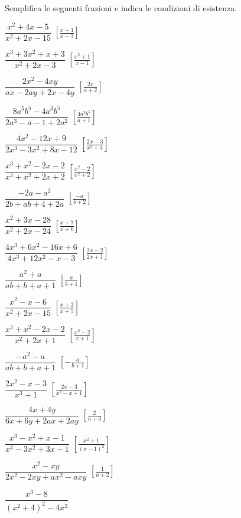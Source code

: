 \begin{esercizio}[\Ast]
\label{ese:19.10}
Semplifica le seguenti frazioni e indica le condizioni di esistenza.
\begin{multicols}{2}
\begin{enumeratea}
 \item \(\dfrac{x^{2}+4x-5}{x^{2}+2x-15}\)
  \hfill \(\left[\frac{x-1}{x-3}\right]\)
 \item \(\dfrac{x^{3}+3x^{2}+x+3}{x^{2}+2x-3}\)
  \hfill \(\left[\frac{x^2+1}{x-1}\right]\)
 \item \(\dfrac{2x^{2}-4xy}{ax-2ay+2x-4y}\)
  \hfill \(\left[\frac{2x}{a+2}\right]\)
 \item \(\dfrac{8a^{5}b^{5}-4a^{3}b^{5}}{2a^{3}-a-1+2a^{2}}\)
  \hfill \(\left[\frac{4a^{3}b^{5}}{a+1}\right]\)
 \item \(\dfrac{4x^{2}-12x+9}{2x^{3}-3x^{2}+8x-12}\)
  \hfill \(\left[\frac{2x-3}{x^{2}+4}\right]\)
 \item \(\dfrac{x^{3}+x^{2}-2x-2}{x^{3}+x^{2}+2x+2}\)
  \hfill \(\left[\frac{x^2-2}{x^2+2}\right]\)
 \item \(\dfrac{-2a-a^{2}}{2b+ab+4+2a}\)
  \hfill \(\left[\frac{-a}{b+2}\right]\)
 \item \(\dfrac{x^{2}+3x-28}{x^{2}+2x-24}\)
  \hfill \(\left[\frac{x+7}{x+6}\right]\)
 \item \(\dfrac{4 x^{3} + 6 x^{2} - 16 x + 6}{4 x^{3} + 12 x^{2} - x - 3}\)
  \hfill \(\left[\frac{2x-2}{2x+1}\right]\)
 \item \(\dfrac{a^{2}+a}{ab+b+a+1}\)
  \hfill \(\left[\frac{a}{b+1}\right]\)
 \item \(\dfrac{x^{2}-x-6}{x^{2}+2x-15}\)
  \hfill \(\left[\frac{x+2}{x+5}\right]\)
 \item \(\dfrac{x^{3}+x^{2}-2x-2}{x^{2}+2x+1}\)
  \hfill \(\left[\frac{x^{2}-2}{x+1}\right]\)
 \item \(\dfrac{-a^{2}-a}{ab+b+a+1}\)
  \hfill \(\left[-\frac{a}{b+1}\right]\)
 \item \(\dfrac{2x^{2}-x-3}{x^{3}+1}\)
  \hfill \(\left[\frac{2x-3}{x^2-x+1}\right]\)
 \item \(\dfrac{4x+4y}{6x+6y+2ax+2ay}\)
  \hfill \(\left[\frac{2}{a+3}\right]\)
 \item \(\dfrac{x^{3}-x^{2}+x-1}{x^{3}-3x^{2}+3x-1}\)
  \hfill \(\left[\frac{x^{2}+1}{(x-1)^2}\right]\)
 \item \(\dfrac{x^{2}-xy}{2x^{2}-2xy+ax^{2}-axy}\)
  \hfill \(\left[\frac{1}{a+2}\right]\)
 \item \(\dfrac{x^{3}-8}{\left(x^{2}+4\right)^{2}-4x^{2}}\)

\end{enumeratea}
\end{multicols}
\end{esercizio}

